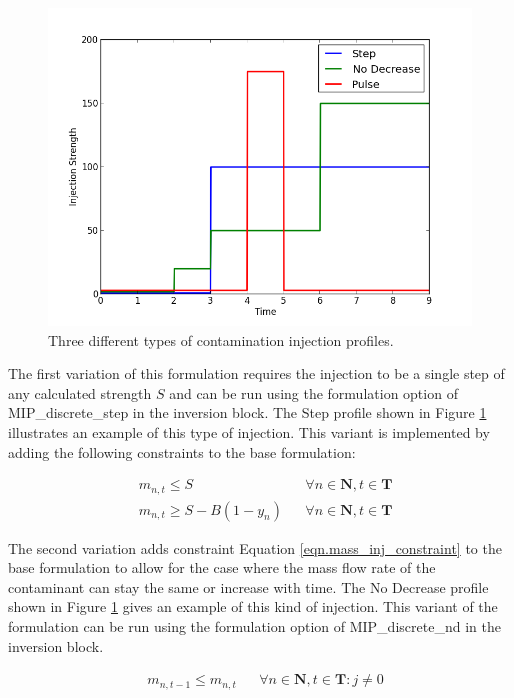 \begin{figure}[h]
  \centering
  \includegraphics[scale=0.5]{graphics/inversion_injection_variation.png}
  \caption{Three different types of contamination injection profiles.}
  \label{fig:inversion_variations}

\end{figure}
             
The first variation of this formulation 
requires the injection to be a single step of any
calculated strength $S$ and can be run using the formulation option of
MIP\_discrete\_step in the inversion block. The Step profile shown in
Figure \ref{fig:inversion_variations} illustrates an example of this
type of injection. This variant is implemented by adding the following constraints to
the base formulation:

\begin{align}
&m_{n,t} \le S &&\forall n \in \mathbf{N}, t\in \mathbf{T} \\
&m_{n,t} \ge S - B(1-y_n) &&\forall n \in \mathbf{N}, t\in \mathbf{T}
\end{align}

The second variation adds constraint Equation \ref{eqn.mass_inj_constraint} 
to the base formulation to allow for
the case where the mass flow rate of the contaminant can stay the same
or increase with time. The No Decrease profile shown in
Figure \ref{fig:inversion_variations} gives an example of this kind of
injection. This variant of the formulation can be run using the
formulation option of MIP\_discrete\_nd in the inversion block.

\begin{align}
 &m_{n,t-1} \le m_{n,t} &&\forall n \in \mathbf{N}, t\in \mathbf{T}:
 j \neq 0 \label{eqn.mass_inj_constraint}
\end{align}

